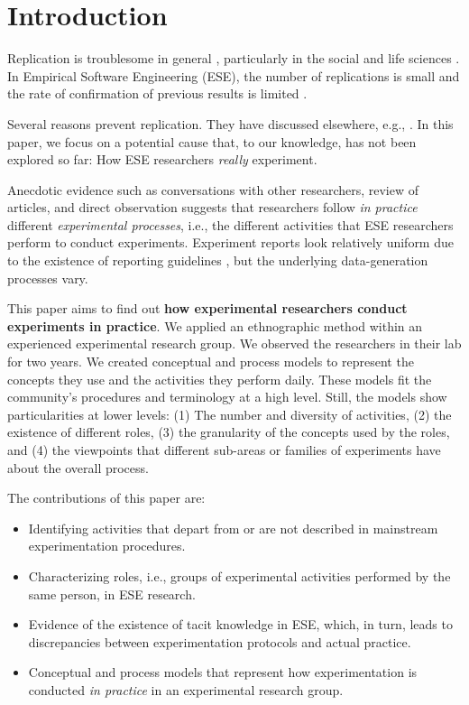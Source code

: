 \section{Introduction}\label{sec-introduction}
Replication is troublesome in general \cite{Klein-2018-many}, particularly in the social and life sciences \cite{Pashler-2012-perspectives} \cite{Baker-2016-lid-reproducibility}. In Empirical Software Engineering (ESE), the number of replications is small \cite{Bezerra-2015-Replication-SE-U-SMS} and the rate of confirmation of previous results is limited \cite{Jorgensen-2016-Incorrects-Results-SEE}.

Several reasons prevent replication. They have discussed elsewhere, e.g., \cite{Miller-2005-replicating-SE-experiments} \cite{Demagalhaes-2015-replications-SE}. In this paper, we focus on a potential cause that, to our knowledge, has not been explored so far: How ESE researchers \textit{really} experiment. 

Anecdotic evidence such as conversations with other researchers, review of articles, and direct observation suggests that researchers follow \textit{in practice} different \textit{experimental processes}, i.e., the different activities that ESE researchers perform to conduct experiments. Experiment reports look relatively uniform due to the existence of reporting guidelines \cite{Carver-2010-guidelines-replication-SE} \cite{Jedlitschka-2008-reporting-experiments-SE}, but the underlying data-generation processes vary.

This paper aims to find out \textbf{how experimental researchers conduct experiments in practice}. We applied an ethnographic method \cite{Sharp-2016-Ethnographic-Studies-ESE} within an experienced experimental research group. We observed the researchers in their lab for two years. We created conceptual and process models to represent the concepts they use and the activities they perform daily. These models fit the community's procedures and terminology at a high level. Still, the models show particularities at lower levels: (1) The number and diversity of activities, (2) the existence of different roles, (3) the granularity of the concepts used by the roles, and (4) the viewpoints that different sub-areas or families of experiments have about the overall process.

The contributions of this paper are:

\begin{itemize}
  \item Identifying activities that depart from or are not described in mainstream experimentation procedures. 
  \item Characterizing roles, i.e., groups of experimental activities performed by the same person, in ESE research.
  \item Evidence of the existence of tacit knowledge in ESE, which, in turn, leads to discrepancies between experimentation protocols and actual practice.
  \item Conceptual and process models that represent how experimentation is conducted \textit{in practice} in an experimental research group.
\end{itemize}

